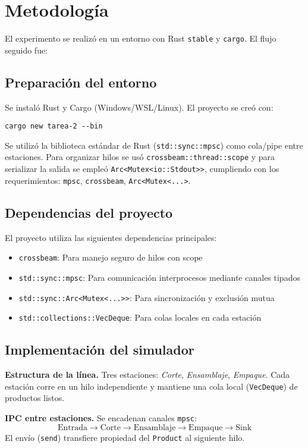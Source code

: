 \documentclass[conference]{IEEEtran}
\begin{document}
\section{Metodología}
El experimento se realizó en un entorno con Rust \texttt{stable} y \texttt{cargo}. El flujo seguido fue:

\subsection{Preparación del entorno}
Se instaló Rust y Cargo (Windows/WSL/Linux). El proyecto se creó con:
\begin{verbatim}
cargo new tarea-2 --bin
\end{verbatim}
Se utilizó la biblioteca estándar de Rust (\texttt{std::sync::mpsc}) como cola/pipe entre estaciones. Para organizar hilos se usó \texttt{crossbeam::thread::scope} y para serializar la salida se empleó \texttt{Arc<Mutex<io::Stdout>>}, cumpliendo con los requerimientos: \texttt{mpsc}, \texttt{crossbeam}, \texttt{Arc<Mutex<...>}.

\subsection{Dependencias del proyecto}
El proyecto utiliza las siguientes dependencias principales:
\begin{itemize}
    \item \texttt{crossbeam}: Para manejo seguro de hilos con scope
    \item \texttt{std::sync::mpsc}: Para comunicación interprocesos mediante canales tipados
    \item \texttt{std::sync::Arc<Mutex<...>>}: Para sincronización y exclusión mutua
    \item \texttt{std::collections::VecDeque}: Para colas locales en cada estación
\end{itemize}

\subsection{Implementación del simulador}
\textbf{Estructura de la línea.} Tres estaciones: \textit{Corte}, \textit{Ensamblaje}, \textit{Empaque}. Cada estación corre en un hilo independiente y mantiene una cola local (\texttt{VecDeque}) de productos listos.

\textbf{IPC entre estaciones.} Se encadenan canales \texttt{mpsc}:
\[
\text{Entrada} \rightarrow \text{Corte} \rightarrow \text{Ensamblaje} \rightarrow \text{Empaque} \rightarrow \text{Sink}
\]
El envío (\texttt{send}) transfiere propiedad del \texttt{Product} al siguiente hilo.
\end{document}
